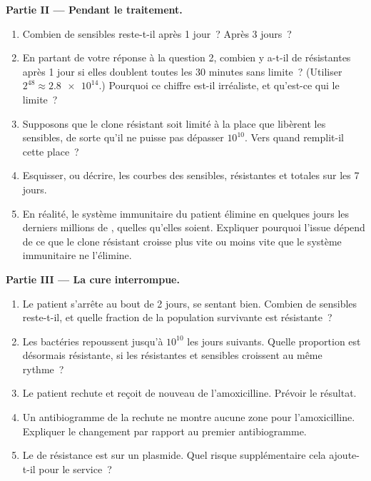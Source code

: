 \begin{problem}
\medskip
\noindent\textbf{Partie II --- Pendant le traitement.}
\begin{enumerate}[resume]
  \item Combien de  sensibles reste-t-il après 1 jour~? Après 3
        jours~?
  \item En partant de votre réponse à la question 2, combien y a-t-il
        de  résistantes après 1 jour si elles doublent toutes
        les 30 minutes sans limite~? (Utiliser
        $2^{48} \approx \num{2.8e14}$.) Pourquoi ce chiffre est-il
        irréaliste, et qu'est-ce qui le limite~?
  \item Supposons que le clone résistant soit limité à la place que
        libèrent les  sensibles, de sorte qu'il ne puisse pas
        dépasser $10^{10}$. Vers quand remplit-il cette place~?
  \item Esquisser, ou décrire, les courbes des  sensibles,
        résistantes et totales sur les 7 jours.
  \item En réalité, le système immunitaire du patient élimine en
        quelques jours les derniers millions de , quelles
        qu'elles soient. Expliquer pourquoi l'issue dépend de ce que le
        clone résistant croisse plus vite ou moins vite que le système
        immunitaire ne l'élimine.
\end{enumerate}

\medskip
\noindent\textbf{Partie III --- La cure interrompue.}
\begin{enumerate}[resume]
  \item Le patient s'arrête au bout de 2 jours, se sentant bien.
        Combien de  sensibles reste-t-il, et quelle fraction de
        la population survivante est résistante~?
  \item Les bactéries repoussent jusqu'à $10^{10}$ les jours suivants.
        Quelle proportion est désormais résistante, si les 
        résistantes et sensibles croissent au même rythme~?
  \item Le patient rechute et reçoit de nouveau de l'amoxicilline.
        Prévoir le résultat.
  \item Un antibiogramme de la rechute ne montre aucune zone pour
        l'amoxicilline. Expliquer le changement par rapport au premier
        antibiogramme.
  \item Le  de résistance est sur un plasmide. Quel risque
        supplémentaire cela ajoute-t-il pour le service~?
\end{enumerate}


\end{problem}
